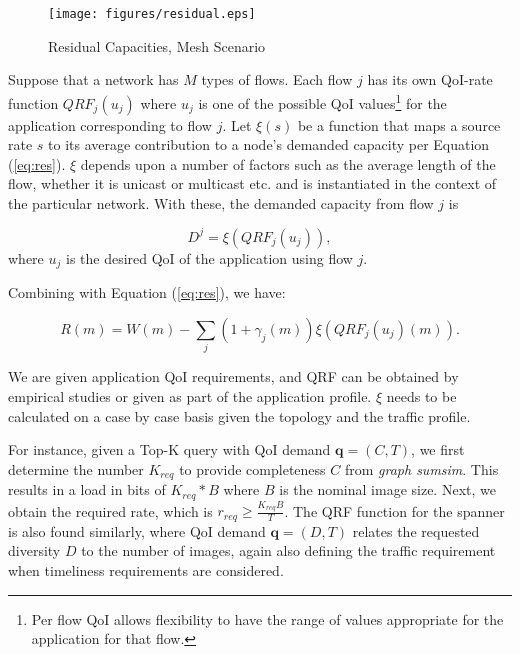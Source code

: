 \begin{figure}
\begin{centering}
    \texttt{[image: figures/residual.eps]}
    \caption{Residual Capacities, Mesh Scenario}
    \label{resf}
\end{centering}
\end{figure}

Suppose that a network has $M$ types of flows. Each flow $j$ has its own
QoI-rate function $QRF_j(u_j)$ where $u_j$ is one of the possible QoI
values\footnote{Per flow QoI allows flexibility to have the range of
values appropriate for the application for that flow.}
for the application corresponding to flow $j$. Let $\xi(s)$ be a function that
maps a source rate $s$ to its average contribution to a node's demanded
capacity per Equation (\ref{eq:res}).
$\xi$ depends upon a number of factors such as the
average length of the flow, whether it is unicast or multicast etc. and
is instantiated in the context of the particular network.
With these, the demanded capacity from flow $j$ is

\begin{equation}
D^j = \xi(QRF_j(u_j)),
\end{equation}
where $u_j$ is the desired QoI of the application using flow $j$.

Combining with Equation (\ref{eq:res}), we have:

\begin{equation}
R(m) = W(m) - \sum_j (1+\gamma_j(m))\xi(QRF_j(u_j)(m))   \label{eq:utility}.
\end{equation}

We are given application QoI requirements, and QRF can be obtained by
empirical studies or given as part of the application profile.
$\xi$ needs to be calculated on a case by case basis
given the topology and the traffic profile.

For instance, given a Top-K query with QoI demand $\textbf{q}=(C,T)$, we first determine the number $K_{req}$ to provide completeness $C$ from \emph{graph sumsim}. This results in a load in bits of $K_{req}*B$ where $B$ is the nominal image size.  Next, we obtain the required rate, which is $r_{req}\geq \frac{K_{req}B}{T}$. The QRF function for the spanner is also found similarly, where QoI demand $\textbf{q}=(D,T)$ relates the requested diversity $D$ to the number of images, again also defining the traffic requirement when timeliness requirements are considered.


